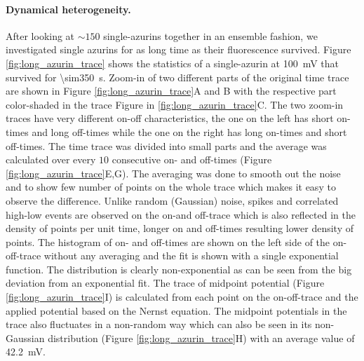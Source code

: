 \paragraph*{Dynamical heterogeneity.}
After looking at ${\sim}150$ single-azurins together in an ensemble fashion, we investigated single azurins for as long time as their fluorescence survived.
Figure \ref{fig:long_azurin_trace} shows the statistics of a single-azurin at \SI{100}{\mV} that survived for \SI{\sim350}{\s}.
Zoom-in of two different parts of the original time trace are shown in Figure \ref{fig:long_azurin_trace}A and B with the respective part color-shaded in the trace Figure in \ref{fig:long_azurin_trace}C.
The two zoom-in traces have very different on-off characteristics, the one on the left has short on-times and long off-times while the one on the right has long on-times and short off-times.
The time trace was divided into small parts and the average was calculated over every $10$ consecutive on- and off-times (Figure \ref{fig:long_azurin_trace}E,G).
The averaging was done to smooth out the noise and to show few number of points on the whole trace which makes it easy to observe the difference.
Unlike random (Gaussian) noise, spikes and correlated high-low events are observed on the on-and off-trace which is also reflected in the density of points per unit time, longer on and off-times resulting lower density of points.
The histogram of on- and off-times are shown on the left side of the on-off-trace without any averaging and the fit is shown with a single exponential function.
The distribution is clearly non-exponential as can be seen from the big deviation from an exponential fit.
The trace of midpoint potential (Figure \ref{fig:long_azurin_trace}I) is calculated from each point on the on-off-trace and the applied potential based on the Nernst equation.
The midpoint potentials in the trace also fluctuates in a non-random way which can also be seen in its non-Gaussian distribution (Figure \ref{fig:long_azurin_trace}H) with an average value of \SI{42.2}{\mV}.
